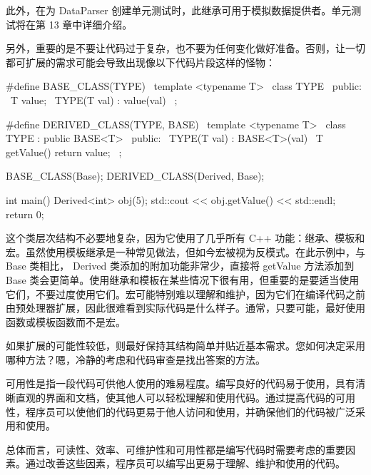 此外，在为 DataParser 创建单元测试时，此继承可用于模拟数据提供者。单元测试将在第 13 章中详细介绍。

另外，重要的是不要让代码过于复杂，也不要为任何变化做好准备。否则，让一切都可扩展的需求可能会导致出现像以下代码片段这样的怪物：

\begin{cpp}
#define BASE_CLASS(TYPE) \
    template <typename T> \
    class TYPE { \
    public: \
        T value; \
        TYPE(T val) : value(val) {} \
    };

#define DERIVED_CLASS(TYPE, BASE) \
    template <typename T> \
    class TYPE : public BASE<T> { \
    public: \
        TYPE(T val) : BASE<T>(val) {} \
        T getValue() { return value; } \
    };

BASE_CLASS(Base);
DERIVED_CLASS(Derived, Base);

int main() {
    Derived<int> obj(5);
    std::cout << obj.getValue() << std::endl;
    return 0;
}
\end{cpp}

这个类层次结构不必要地复杂，因为它使用了几乎所有 C++ 功能：继承、模板和宏。虽然使用模板继承是一种常见做法，但如今宏被视为反模式。在此示例中，与 Base 类相比， Derived 类添加的附加功能非常少，直接将 getValue 方法添加到 Base 类会更简单。使用继承和模板在某些情况下很有用，但重要的是要适当使用它们，不要过度使用它们。宏可能特别难以理解和维护，因为它们在编译代码之前由预处理器扩展，因此很难看到实际代码是什么样子。通常，只要可能，最好使用函数或模板函数而不是宏。

如果扩展的可能性较低，则最好保持其结构简单并贴近基本需求。您如何决定采用哪种方法？嗯，冷静的考虑和代码审查是找出答案的方法。


可用性是指一段代码可供他人使用的难易程度。编写良好的代码易于使用，具有清晰直观的界面和文档，使其他人可以轻松理解和使用代码。通过提高代码的可用性，程序员可以使他们的代码更易于他人访问和使用，并确保他们的代码被广泛采用和使用。

总体而言，可读性、效率、可维护性和可用性都是编写代码时需要考虑的重要因素。通过改善这些因素，程序员可以编写出更易于理解、维护和使用的代码。










